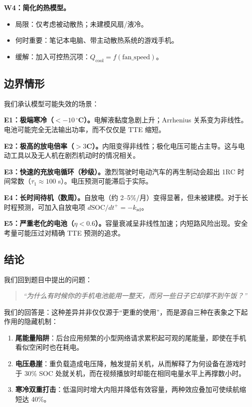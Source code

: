 \documentclass[11pt,a4paper]{ctexart}
\begin{document}
\textbf{W4：简化的热模型。}
\begin{itemize}[leftmargin=2em]
\item 局限：仅考虑被动散热；未建模风扇/液冷。
\item 何时重要：笔记本电脑、带主动散热系统的游戏手机。
\item 缓解：加入可控热沉项：$Q_{\mathrm{cool}} = f(\mathrm{fan\_speed})$。
\end{itemize}

\subsection{边界情形}

我们承认模型可能失效的场景：

\textbf{E1：极端寒冷（$<-10\,^{\circ}$C）。}电解液黏度急剧上升；Arrhenius 关系变为非线性。电池可能完全无法输出功率，而不仅仅是 TTE 缩短。

\textbf{E2：极高的放电倍率（$>3$C）。}内阻变得非线性；极化电压可能占主导。这与电动工具以及无人机在剧烈机动时的情况相关。

\textbf{E3：快速的充放电循环（秒级）。}激烈驾驶时电动汽车的再生制动会超出 1RC 时间常数（$\tau_1 \approx 100$ s）。电压预测可能滞后于实际。

\textbf{E4：长时间待机（数周）。}自放电（约 2--5\%/月）变得显著，但未被建模。对于长时程预测，可加入自放电项 $d\mathrm{SOC}/dt^{+} = -k_{\mathrm{sd}}$。

\textbf{E5：严重老化的电池（$\eta < 0.6$）。}容量衰减呈非线性加速；内短路风险出现。安全考量可能压过对精确 TTE 预测的追求。

\subsection{结论}

我们回到题目中提出的问题：

\begin{quote}
\textit{“为什么有时候你的手机电池能用一整天，而另一些日子它却撑不到午饭？”}
\end{quote}

我们的回答是：这种差异并非仅仅源于“更重的使用”，而是源自三种在表象之下起作用的隐藏机制：

\begin{enumerate}[leftmargin=2em]
\item \textbf{尾能量陷阱}：后台应用频繁的小型网络请求累积起可观的尾能量，即使在手机看似空闲时也在耗电。
\item \textbf{电压悬崖}：重负载造成电压降，触发提前关机，从而解释了为何设备在游戏时于 30\% SOC 处就关机，而在视频播放时却能在相同电量水平上再撑数小时。
\item \textbf{寒冷双重打击}：低温同时增大内阻并降低有效容量，两种效应叠加可使续航缩短达 40\%。
\end{enumerate}
\end{document}
